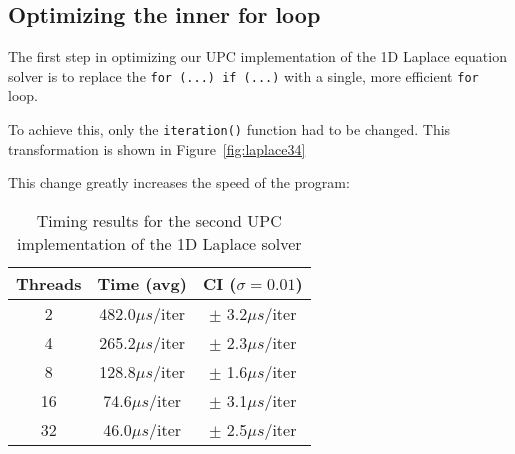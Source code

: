 \documentclass[12pt]{article}
\newcommand{\us}[0]{${\mu}s$}
\begin{document}


\subsection{Optimizing the inner for loop}

The first step in optimizing our UPC implementation of the 1D Laplace equation solver is to replace the \texttt{for (...) if (...)} with a single, more efficient \texttt{for} loop.

To achieve this, only the \texttt{iteration()} function had to be changed.
This transformation is shown in Figure~\ref{fig:laplace34}

This change greatly increases the speed of the program:

\begin{table}[ht]
  \centering\begin{tabular}{|c|c|c|}
    \hline
    Threads & Time (avg) & CI ($\sigma=0.01$) \\
    \hline
    2 & 482.0\us/iter & $\pm$ 3.2\us/iter \\
    4 & 265.2\us/iter & $\pm$ 2.3\us/iter \\
    8 & 128.8\us/iter & $\pm$ 1.6\us/iter \\
    16 & 74.6\us/iter & $\pm$ 3.1\us/iter \\
    32 & 46.0\us/iter & $\pm$ 2.5\us/iter \\
    \hline
  \end{tabular}
  \caption{Timing results for the second UPC implementation of the 1D Laplace solver}
  \label{tab:laplace4}
\end{table}
\end{document}
